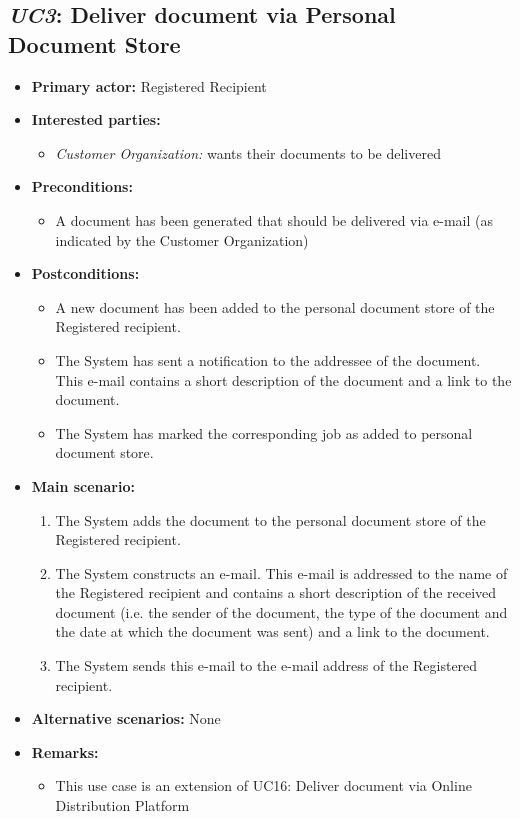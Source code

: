 \documentclass[a4paper,10pt]{article}
\begin{document}
\subsection{\emph{UC3}: Deliver document via Personal Document Store}
\begin{itemize}
	\item \textbf{Primary actor:} Registered Recipient
	\item \textbf{Interested parties:} 
	\begin{itemize}
		\item \textit{Customer Organization:} wants their documents to be delivered
	\end{itemize}
	
	\item \textbf{Preconditions:}
	\begin{itemize}
		\item A document has been generated that should be delivered via e-mail (as indicated by the Customer Organization)
	\end{itemize}
	
	\item \textbf{Postconditions:}
	\begin{itemize}
		\item A new document has been added to the personal document store of the Registered recipient.
		\item The System has sent a notification to the addressee of the document. This e-mail contains a short description of the document and a link to the document.
		\item The System has marked the corresponding job as added to personal document store.
	\end{itemize}
	
	\item \textbf{Main scenario:} 
	\begin{enumerate}
		\item The System adds the document to the personal document store of the Registered recipient.
		\item The System constructs an e-mail. This e-mail is addressed to the name of the Registered recipient and contains a short description of the received document (i.e. the sender of the document, the type of the document and the date at which the document was sent) and a link to the document.
		\item The System sends this e-mail to the e-mail address of the Registered recipient.
	\end{enumerate}
	
	\item \textbf{Alternative scenarios:} 
	None
	
	\item \textbf{Remarks:}
	\begin{itemize}
		\item  This use case is an extension of UC16: Deliver document via Online Distribution Platform
	\end{itemize}
\end{itemize}
\end{document}
